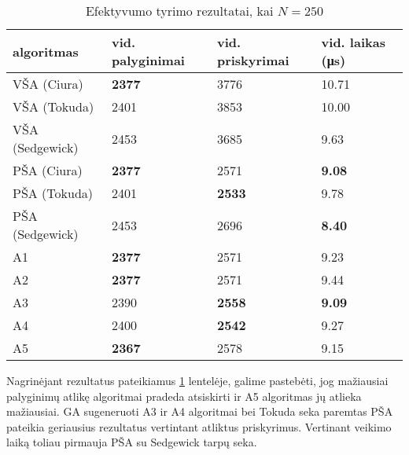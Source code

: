 \documentclass{VUMIFInfKursinis}
\begin{document}
\begin{table}[H]
  \caption{Efektyvumo tyrimo rezultatai, kai $N = 250$}
  \label{results_250}
  \centering
  \begin{tabular}{@{}llll@{}}
  algoritmas & vid. palyginimai                      & vid. priskyrimai                      & vid. laikas (μs)                      \\ \midrule
  VŠA (Ciura)       & \cellcolor[HTML]{70AD47}\textbf{2377} & 3776                                  & 10.71                                 \\
  VŠA (Tokuda)      & 2401                                  & 3853                                  & 10.00                                 \\
  VŠA (Sedgewick)       & 2453                                  & 3685                                  & 9.63                                  \\
  PŠA (Ciura)      & \cellcolor[HTML]{70AD47}\textbf{2377} & 2571                                  & \cellcolor[HTML]{70AD47}\textbf{9.08} \\
  PŠA (Tokuda)      & 2401                                  & \cellcolor[HTML]{70AD47}\textbf{2533} & 9.78                                  \\
  PŠA (Sedgewick)      & 2453                                  & 2696                                  & \cellcolor[HTML]{70AD47}\textbf{8.40} \\
  A1      & \cellcolor[HTML]{70AD47}\textbf{2377} & 2571                                  & 9.23                                  \\
  A2      & \cellcolor[HTML]{70AD47}\textbf{2377} & 2571                                  & 9.44                                  \\
  A3      & 2390                                  & \cellcolor[HTML]{70AD47}\textbf{2558} & \cellcolor[HTML]{70AD47}\textbf{9.09} \\
  A4      & 2400                                  & \cellcolor[HTML]{70AD47}\textbf{2542} & 9.27                                  \\
  A5      & \cellcolor[HTML]{70AD47}\textbf{2367} & 2578                                  & 9.15                                  \\ \bottomrule 
  \end{tabular}
\end{table}

Nagrinėjant rezultatus pateikiamus \ref{results_250} lentelėje, galime pastebėti, jog
mažiausiai palyginimų atlikę algoritmai pradeda atsiskirti ir A5 algoritmas jų atlieka mažiausiai.
GA sugeneruoti A3 ir A4 algoritmai bei Tokuda seka paremtas PŠA pateikia geriausius rezultatus vertintant atliktus priskyrimus.
Vertinant veikimo laiką toliau pirmauja PŠA su Sedgewick tarpų seka.
\end{document}
